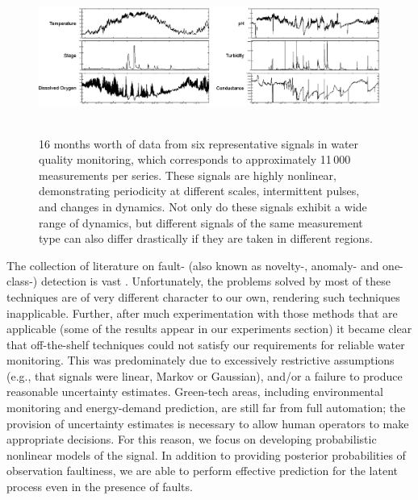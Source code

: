 \documentclass[letterpaper]{article}
\begin{document}
\begin{figure}[t!]
\begin{center}
 \includegraphics[width=\textwidth, height=5cm]{watermonitoring.eps}
\end{center}
\caption{16 months worth of data from six representative
signals in water quality monitoring,
which corresponds to approximately 11\,000 measurements per series.
These signals are highly nonlinear, demonstrating periodicity at
different scales,
intermittent pulses, and changes in dynamics. Not only do these
signals exhibit a wide range of dynamics,
but different signals of the same measurement type can also differ
drastically if they are taken in different regions.
}
\label{fig:monitoring}
\end{figure}


The collection of literature on fault- (also known as novelty-, anomaly-
and one-class-) detection is vast
\cite{Eciolaza2001,deFreitas1996,Isermann2005,Ding2008,Markou2003,Chandola:2009,Khan2010,Dereszynski}.
Unfortunately, the problems solved by most of these techniques are of
very different character to our own, rendering such techniques
inapplicable. Further, after
much experimentation with those methods that are applicable (some of the results
appear in our experiments section) it became clear that off-the-shelf
techniques could not satisfy our requirements for reliable water
monitoring. This was predominately due to excessively restrictive assumptions
(e.g., that signals were linear, Markov or Gaussian), and/or a failure to
produce reasonable uncertainty
estimates. Green-tech areas, including environmental monitoring and
energy-demand prediction, are still far from full
automation; the provision of uncertainty estimates is necessary to
allow human operators to make appropriate decisions. For this reason,
we focus on developing probabilistic nonlinear models of the signal. In
addition to
providing posterior probabilities of observation faultiness, we are
able to perform effective prediction for the latent process even in
the presence of faults.
\end{document}
